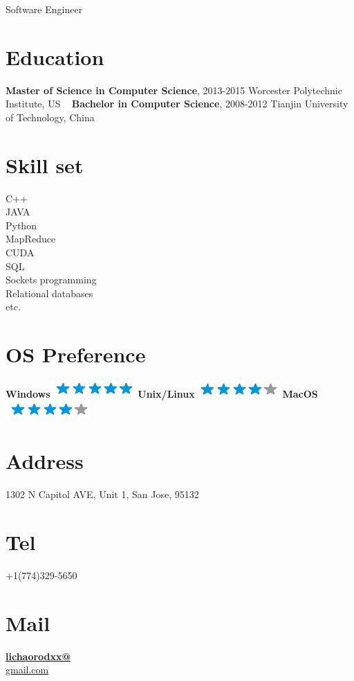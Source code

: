\documentclass[]{friggeri-cv}
\begin{document}
{Software Engineer}


\begin{aside}
	\section{Education}
	\textbf{Master of Science in 
	Computer Science}, 
	2013-2015
	Worcester Polytechnic 
	Institute, US
	~
	\textbf{Bachelor in 
	Computer Science}, 
	2008-2012
	Tianjin University of 
	Technology, China
	\section{Skill set}
	C++\\ JAVA\\ Python\\ MapReduce\\ CUDA\\ SQL\\ Sockets programming\\ Relational databases\\ etc.
	~
	\section{OS Preference}
	\textbf{Windows}\includegraphics[scale=0.40]{img/5stars.png}
	\textbf{Unix/Linux}\includegraphics[scale=0.40]{img/4stars.png}
	\textbf{MacOS}\includegraphics[scale=0.40]{img/4stars.png}
	~
	\section{Address}
	1302 N Capitol AVE,
	Unit 1,
	San Jose, 95132
	\section{Tel}
	+1(774)329-5650
	\section{Mail}
	\href{mailto:lichaorodxx@gmail.com}{\textbf{lichaorodxx@}\\gmail.com}
	~

\end{aside}
\end{document}
